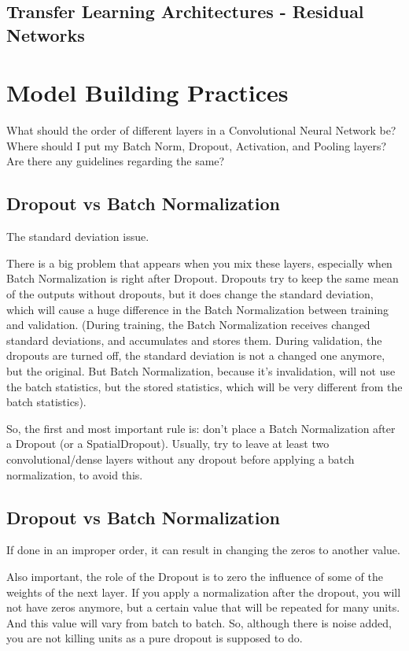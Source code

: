 	\subsection{Transfer Learning Architectures - Residual Networks}


	\section{Model Building Practices}
What should the order of different layers in a Convolutional Neural Network be? Where should I put my Batch Norm, Dropout, Activation, and Pooling layers?  Are there any guidelines regarding the same?

	\subsection{Dropout vs Batch Normalization}
The standard deviation issue.

There is a big problem that appears when you mix these layers, especially when Batch Normalization is right after Dropout.
Dropouts try to keep the same mean of the outputs without dropouts, but it does change the standard deviation, which will cause a huge difference in the Batch Normalization between training and validation. (During training, the Batch Normalization receives changed standard deviations, and accumulates and stores them. During validation, the dropouts are turned off, the standard deviation is not a changed one anymore, but the original. But Batch Normalization, because it's invalidation, will not use the batch statistics, but the stored statistics, which will be very different from the batch statistics).

So, the first and most important rule is: don't place a Batch Normalization after a Dropout (or a SpatialDropout).
Usually,  try to leave at least two convolutional/dense layers without any dropout before applying a batch normalization, to avoid this.

	\subsection{Dropout vs Batch Normalization}
If done in an improper order, it can result in changing the zeros to another value.

Also important, the role of the Dropout is to zero the influence of some of the weights of the next layer.  If you apply a normalization after the dropout, you will not have zeros anymore, but a certain value that will be repeated for many units.  And this value will vary from batch to batch. So, although there is noise added, you are not killing units as a pure dropout is supposed to do.

